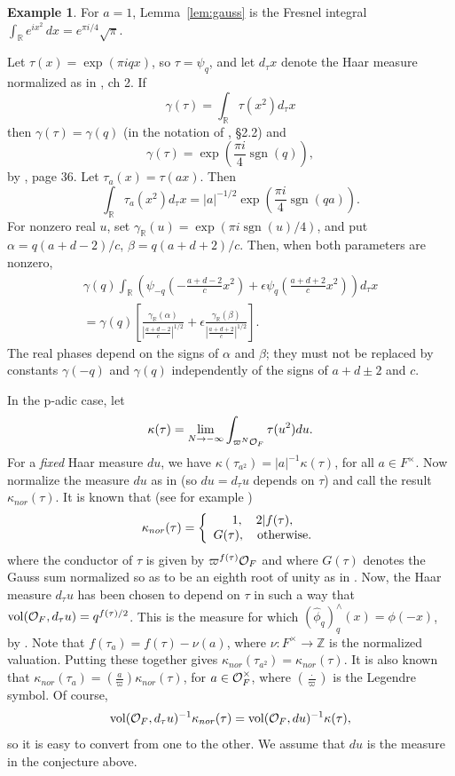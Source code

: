 \documentclass[12pt,letterpaper,openany]{book}
\theoremstyle{plain}
\theoremstyle{definition}
\newtheorem{example}[theorem]{Example}
\theoremstyle{remark}
\theoremstyle{remark}
\DeclareMathOperator{\sgn}{sgn}
\begin{document}
\begin{example}
For $a=1$, Lemma~\ref{lem:gauss} is the Fresnel integral
$\int_{\mathbb R}e^{ix^2}\,dx=e^{\pi i/4}\sqrt{\pi}$.
\end{example}

Let $\tau (x)=\exp (\pi i q x)$, so $\tau=\psi_q$,
and let $d_\tau x$ denote
the Haar measure normalized as in \cite{Ge2}, ch 2. If
\[
\gamma(\tau)=
\int_{\mathbb{R}} \tau(x^2)d_\tau x
\]
then $\gamma(\tau) =\gamma(q)$ (in the notation of \cite{Fl}, \S 2.2) and
\[
\gamma(\tau)=\exp ({\frac{\pi i}{4}} \sgn(q)),
\]
by \cite{Ge2}, page 36. Let $\tau_a(x)=\tau(ax)$. Then
\[
\int_{\mathbb{R}} \tau_a(x^2)d_\tau x
=|a|^{-1/2}\exp\left({\frac{\pi i}{4}}\sgn(qa)\right).
\tag{*}
\]
For nonzero real $u$, set
$\gamma_{\mathbb R}(u)=\exp(\pi i\sgn(u)/4)$, and put
$\alpha=q(a+d-2)/c$, $\beta=q(a+d+2)/c$.
Then, when both parameters are nonzero,
\[
\begin{array}{c}
\gamma(q)
\int_{\mathbb{R}}
\left(\psi_{-q}\left(-\frac{a+d-2}{c}x^2\right)
+\epsilon\psi_q\left(\frac{a+d+2}{c}x^2\right)\right)d_\tau x\\
=\gamma(q)\left[
\frac{\gamma_{\mathbb R}(\alpha)}
     {\left|\frac{a+d-2}{c}\right|^{1/2}}
+\epsilon
\frac{\gamma_{\mathbb R}(\beta)}
     {\left|\frac{a+d+2}{c}\right|^{1/2}}
\right].
\end{array}
\]
The real phases depend on the signs of $\alpha$ and $\beta$; they must
not be replaced by constants $\gamma(-q)$ and $\gamma(q)$ independently
of the signs of $a+d\pm2$ and $c$.

In the p-adic case, let
\[
\kappa(\tau)=\lim_{N\rightarrow - \infty}
\int_{\varpi^N{\cal O}_F}
\tau(u^2) du.
\]
For a \emph{fixed} Haar measure $du$, we have
$\kappa(\tau_{a^2})=|a|^{-1}\kappa(\tau)$, for all
$a\in F^\times$. Now normalize the measure $du$ as in \cite{Mo3}
(so $du=d_\tau u$ depends on $\tau$) and
call the result $\kappa_{nor}(\tau)$. It is known
that (see for example \cite{Mo3})
\[
\kappa_{nor}(\tau)=
\left\{
    \begin{array}{c}
    1,\ \ \ 2|f(\tau),\\
    G(\tau),\ \ \ {\rm otherwise}.
    \end{array}
\right.
\]
where the conductor of $\tau$ is given by
$\varpi^{f(\tau)}{\cal O}_F$ and where $G(\tau)$ denotes the Gauss sum
normalized so as to be an eighth root of unity as in \cite{Mo3}.
Now, the Haar measure $d_\tau u$ has been chosen to depend on
$\tau$ in such a way that $\operatorname{vol}({\cal O}_F,d_\tau u)=q^{f(\tau)/2}$.
This is the measure for which $(\hat{\phi}_q)^\wedge_q(x)=\phi(-x)$,
by \cite{Shal}.
Note that $f(\tau_a)=f(\tau)-\nu(a)$, where
$\nu : F^\times \rightarrow {\mathbb{Z}}$ is the normalized
valuation. Putting these together gives
$\kappa_{nor}(\tau_{a^2})=\kappa_{nor}(\tau)$. It is also known that
$\kappa_{nor}(\tau_{a})=({\frac{a}{\varpi}})\kappa_{nor}(\tau)$, for
$a\in {\cal O}_F^\times$, where $\left(\frac{\cdot}{\varpi}\right)$ is the
Legendre symbol. Of course,
\[
\operatorname{vol}({\cal O}_F,d_\tau u)^{-1}
\kappa_{nor}(\tau)
=\operatorname{vol}({\cal O}_F,du)^{-1}\kappa(\tau),
\]
so it is easy to convert from one to the other.
We assume that $du$ is the measure in the conjecture above.
\end{document}
